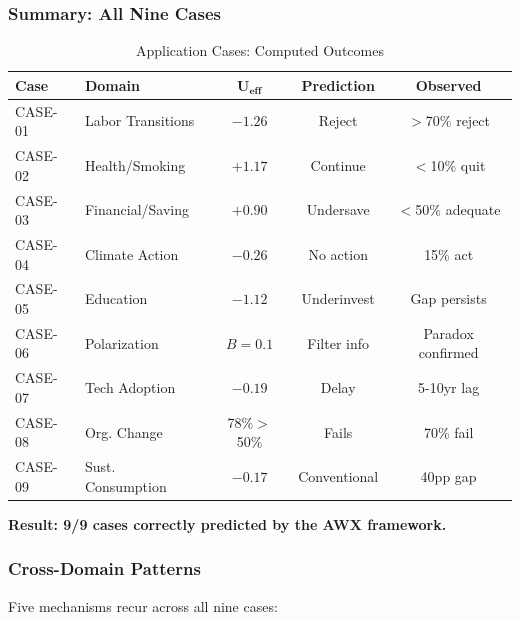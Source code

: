 \subsubsection{Summary: All Nine Cases}

\begin{table}[htbp]
\centering
\caption{Application Cases: Computed Outcomes}
\label{tab:case-computed-summary}
\small
\begin{tabular}{llccc}
\toprule
\textbf{Case} & \textbf{Domain} & $\mathbf{U_{eff}}$ & \textbf{Prediction} & \textbf{Observed} \\
\midrule
CASE-01 & Labor Transitions & $-1.26$ & Reject & $>$70\% reject \\
CASE-02 & Health/Smoking & $+1.17$ & Continue & $<$10\% quit \\
CASE-03 & Financial/Saving & $+0.90$ & Undersave & $<$50\% adequate \\
CASE-04 & Climate Action & $-0.26$ & No action & 15\% act \\
CASE-05 & Education & $-1.12$ & Underinvest & Gap persists \\
CASE-06 & Polarization & $B=0.1$ & Filter info & Paradox confirmed \\
CASE-07 & Tech Adoption & $-0.19$ & Delay & 5-10yr lag \\
CASE-08 & Org. Change & 78\%$>$50\% & Fails & 70\% fail \\
CASE-09 & Sust. Consumption & $-0.17$ & Conventional & 40pp gap \\
\bottomrule
\end{tabular}
\end{table}

\textbf{Result: 9/9 cases correctly predicted by the AWX framework.}


\subsubsection{Cross-Domain Patterns}

Five mechanisms recur across all nine cases:

